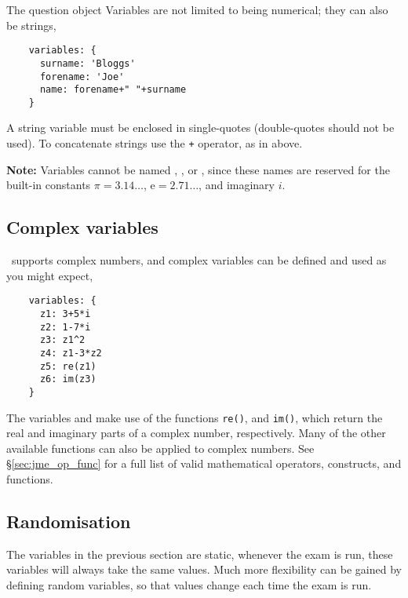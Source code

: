 \begin{chapter}{\label{cha:question_object}The question object}
  Variables are not limited to being numerical; they can also be strings, \eg
  \begin{Verbatim}
    variables: {
      surname: 'Bloggs'
      forename: 'Joe'
      name: forename+" "+surname
    }
  \end{Verbatim}
  A string variable must be enclosed in single-quotes (double-quotes should not
  be used).  To concatenate strings use the \verb"+" operator, as in
   above.

  \textbf{Note:} Variables cannot be named , , or
  , since these names are reserved for the built-in constants
  $\pi=3.14\ldots$, $\mathrm{e}=2.71\ldots$, and imaginary $i$.

  \subsection{Complex variables}
  \numbas\ supports complex numbers, and complex variables can be defined and
  used as you might expect, \eg
  \begin{Verbatim}
    variables: {
      z1: 3+5*i
      z2: 1-7*i
      z3: z1^2
      z4: z1-3*z2
      z5: re(z1)
      z6: im(z3)
    }
  \end{Verbatim}
  The variables  and  make use of the functions
  \verb"re()", and \verb"im()", which return the real and imaginary parts of a
  complex number, respectively.  Many of the other available functions can also
  be applied to complex numbers.  See \S\ref{sec:jme_op_func} for a full list
  of valid mathematical operators, constructs, and functions.

  \subsection{\label{sec:randomisation}Randomisation}
  The variables in the previous section are static, \ie whenever the exam is
  run, these variables will always take the same values.  Much more flexibility
  can be gained by defining random variables, so that values change each time
  the exam is run.


\end{chapter}
